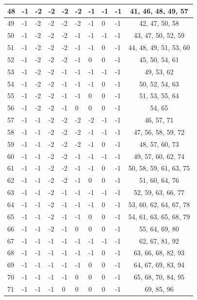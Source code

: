 \begin{longtable}{|l|l|l|l|l|l|l|l|l|c|}
48 & -1 & -2 & -2 & -2 & -2 & -1 & -1 & -1 & 41, 46, 48, 49, 57 \\ \hline
49 & -1 & -2 & -2 & -2 & -2 & -1 & 0 & -1 & 42, 47, 50, 58 \\ \hline
50 & -1 & -2 & -2 & -2 & -1 & -1 & -1 & -1 & 43, 47, 50, 52, 59 \\ \hline
51 & -1 & -2 & -2 & -2 & -1 & -1 & 0 & -1 & 44, 48, 49, 51, 53, 60 \\ \hline
52 & -1 & -2 & -2 & -2 & -1 & 0 & 0 & -1 & 45, 50, 54, 61 \\ \hline
53 & -1 & -2 & -2 & -1 & -1 & -1 & -1 & -1 & 49, 53, 62 \\ \hline
54 & -1 & -2 & -2 & -1 & -1 & -1 & 0 & -1 & 50, 52, 54, 63 \\ \hline
55 & -1 & -2 & -2 & -1 & -1 & 0 & 0 & -1 & 51, 53, 55, 64 \\ \hline
56 & -1 & -2 & -2 & -1 & 0 & 0 & 0 & -1 & 54, 65 \\ \hline
57 & -1 & -1 & -2 & -2 & -2 & -2 & -1 & -1 & 46, 57, 71 \\ \hline
58 & -1 & -1 & -2 & -2 & -2 & -1 & -1 & -1 & 47, 56, 58, 59, 72 \\ \hline
59 & -1 & -1 & -2 & -2 & -2 & -1 & 0 & -1 & 48, 57, 60, 73 \\ \hline
60 & -1 & -1 & -2 & -2 & -1 & -1 & -1 & -1 & 49, 57, 60, 62, 74 \\ \hline
61 & -1 & -1 & -2 & -2 & -1 & -1 & 0 & -1 & 50, 58, 59, 61, 63, 75 \\ \hline
62 & -1 & -1 & -2 & -2 & -1 & 0 & 0 & -1 & 51, 60, 64, 76 \\ \hline
63 & -1 & -1 & -2 & -1 & -1 & -1 & -1 & -1 & 52, 59, 63, 66, 77 \\ \hline
64 & -1 & -1 & -2 & -1 & -1 & -1 & 0 & -1 & 53, 60, 62, 64, 67, 78 \\ \hline
65 & -1 & -1 & -2 & -1 & -1 & 0 & 0 & -1 & 54, 61, 63, 65, 68, 79 \\ \hline
66 & -1 & -1 & -2 & -1 & 0 & 0 & 0 & -1 & 55, 64, 69, 80 \\ \hline
67 & -1 & -1 & -1 & -1 & -1 & -1 & -1 & -1 & 62, 67, 81, 92 \\ \hline
68 & -1 & -1 & -1 & -1 & -1 & -1 & 0 & -1 & 63, 66, 68, 82, 93 \\ \hline
69 & -1 & -1 & -1 & -1 & -1 & 0 & 0 & -1 & 64, 67, 69, 83, 94 \\ \hline
70 & -1 & -1 & -1 & -1 & 0 & 0 & 0 & -1 & 65, 68, 70, 84, 95 \\ \hline
71 & -1 & -1 & -1 & 0 & 0 & 0 & 0 & -1 & 69, 85, 96 \\ \hline

\end{longtable}
